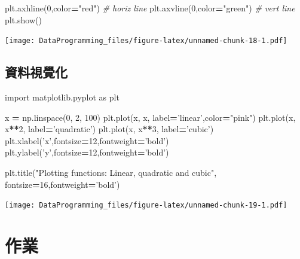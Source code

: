 \documentclass[]{book}
\newenvironment{Shaded}{\begin{snugshade}}{\end{snugshade}}
\newcommand{\CommentTok}[1]{\textcolor[rgb]{0.56,0.35,0.01}{\textit{#1}}}
\newcommand{\DecValTok}[1]{\textcolor[rgb]{0.00,0.00,0.81}{#1}}
\newcommand{\ImportTok}[1]{#1}
\newcommand{\NormalTok}[1]{#1}
\newcommand{\OperatorTok}[1]{\textcolor[rgb]{0.81,0.36,0.00}{\textbf{#1}}}
\newcommand{\StringTok}[1]{\textcolor[rgb]{0.31,0.60,0.02}{#1}}
\begin{document}
\begin{Shaded}
\begin{Highlighting}[]
\NormalTok{plt.axhline(}\DecValTok{0}\NormalTok{,color}\OperatorTok{=}\StringTok{"red"}\NormalTok{) }\CommentTok{# horiz line}
\NormalTok{plt.axvline(}\DecValTok{0}\NormalTok{,color}\OperatorTok{=}\StringTok{"green"}\NormalTok{) }\CommentTok{# vert line}
\NormalTok{plt.show()}
\end{Highlighting}
\end{Shaded}

\texttt{[image: DataProgramming\_files/figure-latex/unnamed-chunk-18-1.pdf]}

\hypertarget{section-10}{%
\subsection{資料視覺化}\label{section-10}}

\begin{Shaded}
\begin{Highlighting}[]

\ImportTok{import}\NormalTok{ matplotlib.pyplot }\ImportTok{as}\NormalTok{ plt}

\NormalTok{x }\OperatorTok{=}\NormalTok{ np.linspace(}\DecValTok{0}\NormalTok{, }\DecValTok{2}\NormalTok{, }\DecValTok{100}\NormalTok{)}
\NormalTok{plt.plot(x, x, label}\OperatorTok{=}\StringTok{'linear'}\NormalTok{,color}\OperatorTok{=}\StringTok{"pink"}\NormalTok{)}
\NormalTok{plt.plot(x, x}\OperatorTok{**}\DecValTok{2}\NormalTok{, label}\OperatorTok{=}\StringTok{'quadratic'}\NormalTok{)}
\NormalTok{plt.plot(x, x}\OperatorTok{**}\DecValTok{3}\NormalTok{, label}\OperatorTok{=}\StringTok{'cubic'}\NormalTok{)}
\NormalTok{plt.xlabel(}\StringTok{'x'}\NormalTok{,fontsize}\OperatorTok{=}\DecValTok{12}\NormalTok{,fontweight}\OperatorTok{=}\StringTok{'bold'}\NormalTok{)}
\NormalTok{plt.ylabel(}\StringTok{'y'}\NormalTok{,fontsize}\OperatorTok{=}\DecValTok{12}\NormalTok{,fontweight}\OperatorTok{=}\StringTok{'bold'}\NormalTok{)}

\NormalTok{plt.title(}\StringTok{"Plotting functions: Linear, quadratic and cubic"}\NormalTok{, fontsize}\OperatorTok{=}\DecValTok{16}\NormalTok{,fontweight}\OperatorTok{=}\StringTok{'bold'}\NormalTok{)}
\end{Highlighting}
\end{Shaded}

\texttt{[image: DataProgramming\_files/figure-latex/unnamed-chunk-19-1.pdf]}

\hypertarget{section-11}{%
\section{作業}\label{section-11}}
\end{document}
